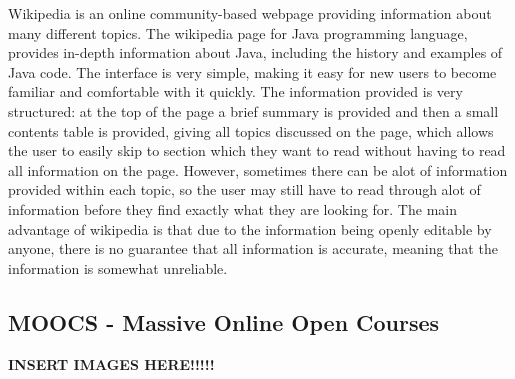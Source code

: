 \documentclass{article}
\begin{document}
Wikipedia is an online community-based webpage providing information about many different topics. The wikipedia page for Java programming language, provides in-depth information about Java, including the history and examples of Java code. The interface is very simple, making it easy for new users to become familiar and comfortable with it quickly. The information provided is very structured: at the top of the page a brief summary is provided and then a small contents table is provided, giving all topics discussed on the page, which allows the user to easily skip to section which they want to read without having to read all information on the page. However, sometimes there can be alot of information provided within each topic, so the user may still have to read through alot of information before they find exactly what they are looking for. The main advantage of wikipedia is that due to the information being openly editable by anyone, there is no guarantee that all information is accurate, meaning that the information is somewhat unreliable.\\

\subsection{MOOCS - Massive Online Open Courses}

\textbf{INSERT IMAGES HERE!!!!!}\\
\end{document}
